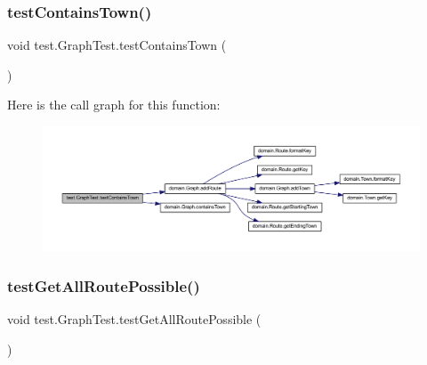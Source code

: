 \subsubsection{\texorpdfstring{test\+Contains\+Town()}{testContainsTown()}}
{\footnotesize\ttfamily void test.\+Graph\+Test.\+test\+Contains\+Town (\begin{DoxyParamCaption}{ }\end{DoxyParamCaption})}

Here is the call graph for this function\+:\nopagebreak
\begin{figure}[H]
\begin{center}
\leavevmode
\includegraphics[width=350pt]{classtest_1_1_graph_test_af2355b40a0a4852b32d3d956ec244539_cgraph}
\end{center}
\end{figure}
\mbox{\label{classtest_1_1_graph_test_a6ba6493ed4d053e9476f9e15744f4f11}} 
\subsubsection{\texorpdfstring{test\+Get\+All\+Route\+Possible()}{testGetAllRoutePossible()}}
{\footnotesize\ttfamily void test.\+Graph\+Test.\+test\+Get\+All\+Route\+Possible (\begin{DoxyParamCaption}{ }\end{DoxyParamCaption})}

